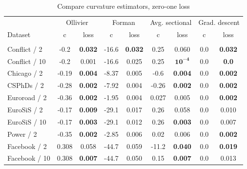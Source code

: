 \documentclass{article} %
\begin{document}
\begin{table}[t]
\caption{Compare curvature estimators, zero-one loss}
\label{tab:compare_zero_one}
\begin{center}
\begin{tabular}{lcccccc|cc}
&
\multicolumn{2}{c}{Ollivier} &
\multicolumn{2}{c}{Forman} &
\multicolumn{2}{c}{Avg. sectional} &
\multicolumn{2}{|c}{Grad. descent} 
\\
Dataset & c & loss  & c & loss  & c & loss & c & loss %
\\
\hline \\
Conflict / 2 &
-0.2 & \textbf{0.032} &
-16.6 &\textbf{0.032} &
0.25 & 0.060 &
0.0 & \textbf{0.032} \\
Conflict / 10 &
-0.2 & 0.001 &
-16.6 &	0.025 &
0.25 & $\mathbf{10^{-4}}$ &
0.0 & \textbf{0.0}  \\
Chicago / 2 &
-0.19 & \textbf{0.004} & 
-8.37 & 0.005 & 
-0.6 & \textbf{0.004} & 
0.0 & \textbf{0.002}  \\
CSPhDs / 2 &
-0.28 &	\textbf{0.002} &
-7.92 &	0.004 &
-0.26 & \textbf{0.002} &
0.0 & \textbf{0.002}  \\
Euroroad / 2 &
-0.36 &	\textbf{0.002} &
-1.95 &	0.004 &
0.027 &	0.005 &
0.0 & \textbf{0.002} \\
EuroSiS / 2 &
-0.17 & \textbf{0.009} & 
-29.1 & 0.017 & 
0.26 & 0.058 & 
0.0 & 0.010  \\
EuroSiS / 10 &
-0.17 & \textbf{0.003} & 
-29.1 & 0.012 & 
0.26 & \textbf{0.003} & 
0.0 & 0.007\\
Power / 2 &
-0.35 & \textbf{0.002} &
 -2.85 & 0.006 &
 0.02 & 0.006 &
0.0 & \textbf{0.002}  \\
Facebook / 2 &
0.308 & 0.058 & 
-44.7 & 0.059 & 
-11.2 & \textbf{0.040} &
0.0 & \textbf{0.019} \\
Facebook / 10 &
0.308 & \textbf{0.007} & 
-44.7 & 0.050 & 
0.15 & \textbf{0.007} & 
0.0 & 0.013 \\
\end{tabular}
\end{center}
\end{table}
\end{document}
